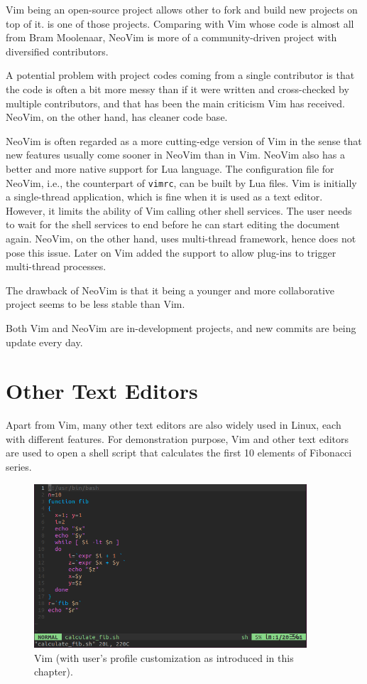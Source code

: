 Vim being an open-source project allows other to fork and build new projects on top of it.  is one of those projects. Comparing with Vim whose code is almost all from Bram Moolenaar, NeoVim is more of a community-driven project with diversified contributors. 

A potential problem with project codes coming from a single contributor is that the code is often a bit more messy than if it were written and cross-checked by multiple contributors, and that has been the main criticism Vim has received. NeoVim, on the other hand, has cleaner code base. 

NeoVim is often regarded as a more cutting-edge version of Vim in the sense that new features usually come sooner in NeoVim than in Vim. NeoVim also has a better and more native support for Lua language. The configuration file for NeoVim, i.e., the counterpart of \verb|vimrc|, can be built by Lua files. Vim is initially a single-thread application, which is fine when it is used as a text editor. However, it limits the ability of Vim calling other shell services. The user needs to wait for the shell services to end before he can start editing the document again. NeoVim, on the other hand, uses multi-thread framework, hence does not pose this issue. Later on Vim added the support to allow plug-ins to trigger multi-thread processes.

The drawback of NeoVim is that it being a younger and more collaborative project seems to be less stable than Vim.

Both Vim and NeoVim are in-development projects, and new commits are being update every day. 

\section{Other Text Editors}

Apart from Vim, many other text editors are also widely used in Linux, each with different features. For demonstration purpose, Vim and other text editors are used to open a shell script that calculates the first 10 elements of Fibonacci series.

\begin{figure}[!htb]
	\centering
	\includegraphics[width=4in]{chapters/part-1/figures/vim_fib.png}
	\caption{Vim (with user's profile customization as introduced in this chapter).}
\end{figure}

